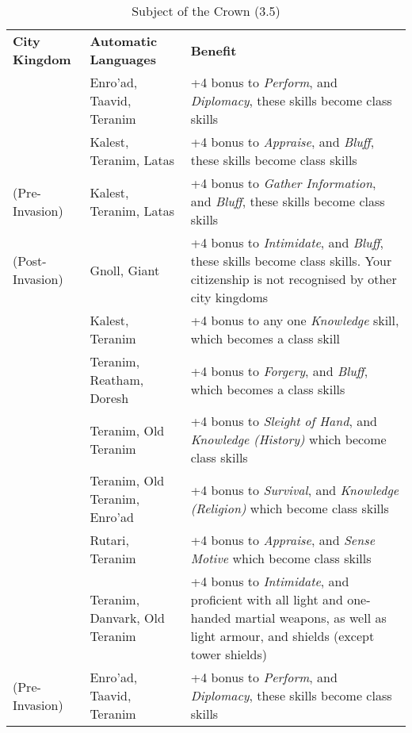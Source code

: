 \begin{table*}[!htb]
  \small
  \caption{Subject of the Crown (3.5)}
  \begin{tabular}{l p{5cm} p{7cm}}
    \textbf{City Kingdom}                    & \textbf{Automatic Languages} & \textbf{Benefit} \\
    \nameref{sec:Avenfjord}                  & Enro'ad, Taavid, Teranim     & +4 bonus to \emph{Perform}, and \emph{Diplomacy}, these skills become class skills \\
    \nameref{sec:El-Fayam}                   & Kalest, Teranim, Latas       & +4 bonus to \emph{Appraise}, and \emph{Bluff}, these skills become class skills \\
    \nameref{sec:Esmayar} (Pre-Invasion)     & Kalest, Teranim, Latas       & +4 bonus to \emph{Gather Information}, and \emph{Bluff}, these skills become class skills \\
    \nameref{sec:Esmayar} (Post-Invasion)    & Gnoll, Giant                 & +4 bonus to \emph{Intimidate}, and \emph{Bluff}, these skills become class skills. Your citizenship is not recognised by other city kingdoms \\
    \nameref{sec:Fes al-Bashir}              & Kalest, Teranim              & +4 bonus to any one \emph{Knowledge} skill, which becomes a class skill \\
    \nameref{sec:Forsby}                     & Teranim, Reatham, Doresh     & +4 bonus to \emph{Forgery}, and \emph{Bluff}, which becomes a class skills \\
    \nameref{sec:Helmarnock}                 & Teranim, Old Teranim         & +4 bonus to \emph{Sleight of Hand}, and \emph{Knowledge (History)} which become class skills \\
    \nameref{sec:Hraglund}                   & Teranim, Old Teranim, Enro'ad& +4 bonus to \emph{Survival}, and \emph{Knowledge (Religion)} which become class skills \\
    \nameref{sec:Kesmar}                     & Rutari, Teranim              & +4 bonus to \emph{Appraise}, and \emph{Sense Motive} which become class skills \\
    \nameref{sec:Morkan}                     & Teranim, Danvark, Old Teranim& +4 bonus to \emph{Intimidate}, and proficient with all light and one-handed martial weapons, as well as light armour, and shields (except tower shields) \\
    \nameref{sec:Nen-Hilith} (Pre-Invasion)  & Enro'ad, Taavid, Teranim     & +4 bonus to \emph{Perform}, and \emph{Diplomacy}, these skills become class skills \\

\end{tabular}
\end{table*}
